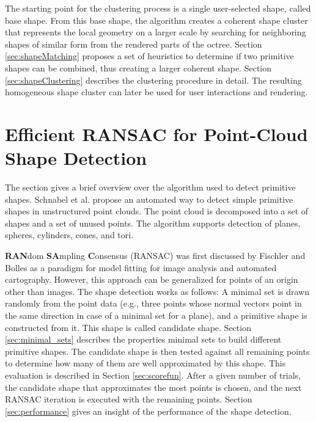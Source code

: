 The starting point for the clustering process is a single user-selected shape, called base shape. From this base shape, the algorithm creates a coherent shape cluster that represents the local geometry on a larger scale by searching for neighboring shapes of similar form from the rendered parts of the octree. Section \ref{sec:shapeMatching} proposes a set of heuristics to determine if two primitive shapes can be combined, thus creating a larger coherent shape. 
Section \ref{sec:shapeClustering} describes the clustering procedure in detail. The resulting homogeneous shape cluster can later be used for user interactions and rendering. 


\section{Efficient RANSAC for Point-Cloud Shape Detection}

\label{sec:schnabel}

The section gives a brief overview over the algorithm used to detect primitive shapes. 
Schnabel et al. \cite{schnabel-2007-efficient} propose an automated way to detect simple primitive shapes in unstructured point clouds. The point cloud is decomposed into a set of shapes and a set of unused points. The algorithm supports detection of planes, spheres, cylinders, cones, and tori. 

\par

\textbf{RAN}dom \textbf{SA}mpling \textbf{C}onsensus (RANSAC) was first discussed by Fischler and Bolles \cite{fischler1981random} as a paradigm for model fitting for image analysis and automated cartography. However, this approach can be generalized for points of an origin other than images. The shape detection works as follows: A minimal set is drawn randomly from the point data (e.g., three points whose normal vectors point in the same direction in case of a minimal set for a plane), and a primitive shape is constructed from it. This shape is called candidate shape. Section \ref{sec:minimal_sets} describes the properties minimal sets to build different primitive shapes. The candidate shape is then tested against all remaining points to determine how many of them are well approximated by this shape. This evaluation is described in Section \ref{sec:scorefun}. After a given number of trials, the candidate shape that approximates the most points is chosen, and the next RANSAC iteration is executed with the remaining points. Section \ref{sec:performance} gives an insight of the performance of the shape detection. 


